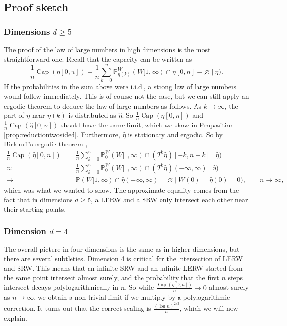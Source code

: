 \documentclass{article}
\DeclareMathOperator{\Ca}{Cap}
\renewcommand{\P}{\mathbb{P}}
\newcommand{\1}{\mathbf{1}}
\newcommand{\heta}{\hat\eta}
\theoremstyle{definition}
\numberwithin{equation}{section}
\numberwithin{theorem}{section}
\begin{document}
\subsection{Proof sketch}\label{sec:sketch-lerw}
\subsubsection{Dimensions \texorpdfstring{$d\geq5$}{d>=5}}
The proof of the law of large numbers in high dimensions is the most straightforward one. Recall that the capacity can be written as
\begin{equation}
	\frac{1}{n}\Ca(\eta[0,n])=\frac{1}{n}\sum_{k=0}^n\P^W_{\eta(k)}(W[1,\infty)\cap\eta[0,n]=\varnothing\mid\eta).
\end{equation}
If the probabilities in the sum above were i.i.d., a strong law of large numbers would follow immediately. This is of course not the case, but we can still apply an ergodic theorem to deduce the law of large numbers as follows. As $k\rightarrow\infty$, the part of $\eta$ near $\eta(k)$ is distributed as $\heta$. So $\frac{1}{n}\Ca(\eta[0,n])$ and $\frac{1}{n}\Ca(\heta[0,n])$ should have the same limit, which we show in Proposition \ref{prop:reductiontwosided}. Furthermore, $\heta$ is stationary and ergodic. So by Birkhoff's ergodic theorem \cite[Theorem 24.1]{billingsley1995probability},
\begin{equation}
	\begin{split}
		\frac{1}{n}\Ca(\heta[0,n])=&\frac{1}{n}\sum_{k=0}^n\P^W_0(W[1,\infty)\cap(T^k\heta)[-k,n-k]\mid\heta)\\
		\approx&\frac{1}{n}\sum_{k=0}^n\P^W_0(W[1,\infty)\cap(T^k\heta)(-\infty,\infty)\mid\heta)\\
		\rightarrow&\P(W[1,\infty)\cap\heta(-\infty,\infty)=\varnothing\mid W(0)=\heta(0)=0),\qquad n\rightarrow\infty,
	\end{split}
\end{equation}
which was what we wanted to show. The approximate equality comes from the fact that in dimensions $d\geq5$, a LERW and a SRW only intersect each other near their starting points.


\subsubsection{Dimension \texorpdfstring{$d=4$}{d=4}}
The overall picture in four dimensions is the same as in higher dimensions, but there are several subtleties. Dimension 4 is critical for the intersection of LERW and SRW. This means that an infinite SRW and an infinite LERW started from the same point intersect almost surely, and the probability that the first $n$ steps intersect decays polylogarithmically in $n$. So while $\frac{\Ca(\eta[0,n])}{n}\rightarrow0$ almost surely as $n\rightarrow\infty$, we obtain a non-trivial limit if we multiply by a polylogarithmic correction. It turns out that the correct scaling is $\frac{(\log n)^{2/3}}{n}$, which we will now explain.
\end{document}
